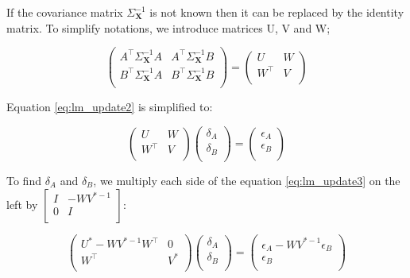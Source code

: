 \documentclass[12pt]{article}
\begin{document}
If the covariance matrix $\Sigma^{-1}_{\mathbf{X}}$ is not known then it can be replaced by the identity matrix. To simplify notations, we introduce matrices U, V and W;

\[
    \left ( 
    \begin{matrix}
        A^\top\Sigma^{-1}_{\mathbf{X}}A &  A^\top\Sigma^{-1}_{\mathbf{X}}B \\
        B^\top\Sigma^{-1}_{\mathbf{X}}A &  B^\top\Sigma^{-1}_{\mathbf{X}}B \\
    \end{matrix}
    \right )
=
\left (
  \begin{matrix}
      U & W \\
      W^\top & V \\
  \end{matrix}
\right )
\]

Equation \ref{eq:lm_update2} is simplified to:

\begin{equation}
  \label{eq:lm_update3}
  \left (
    \begin{matrix}
        U & W \\
        W^\top & V \\
    \end{matrix}
  \right )
  \left (
  \begin{matrix}
    \delta_A \\
    \delta_B \\
  \end{matrix}
  \right )
  = 
  \left (
  \begin{matrix}
    \epsilon_A \\
    \epsilon_B \\
  \end{matrix}
  \right )
\end{equation}

To find $\delta_A$ and $\delta_B$, we multiply each side of the equation \ref{eq:lm_update3} on the left by $\left [ \begin{matrix} I & -WV^{\ast -1} \\ 0 & I \\ \end{matrix} \right ]$:

\begin{equation}
  \label{eq:lm_update4}
  \left (
    \begin{matrix}
        U^\ast - WV^{\ast -1}W^\top & 0 \\
        W^\top & V^\ast \\
    \end{matrix}
  \right )
  \left (
  \begin{matrix}
    \delta_A \\
    \delta_B \\
  \end{matrix}
  \right )
  = 
  \left (
  \begin{matrix}
    \epsilon_A - WV^{\ast -1}\epsilon_B \\
    \epsilon_B \\
  \end{matrix}
  \right )
\end{equation}
\end{document}
